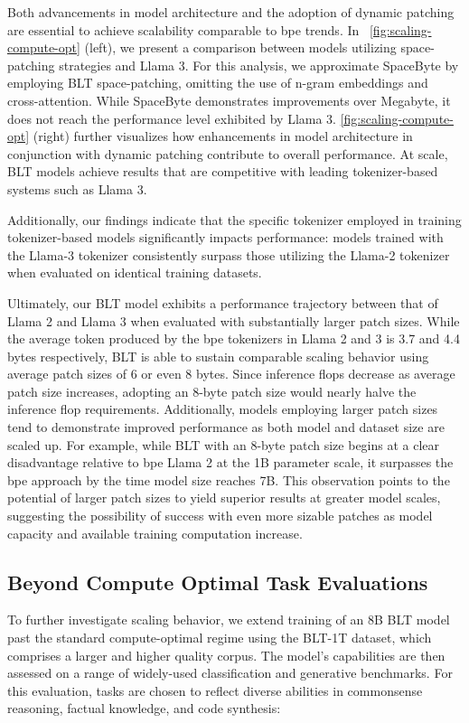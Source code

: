 Both advancements in model architecture and the adoption of dynamic patching are essential to achieve scalability comparable to bpe trends. In ~\autoref{fig:scaling-compute-opt} (left), we present a comparison between models utilizing space-patching strategies and Llama 3. For this analysis, we approximate SpaceByte \citep{slagle2024spacebyte} by employing {\textsc BLT} space-patching, omitting the use of n-gram embeddings and cross-attention. While SpaceByte demonstrates improvements over Megabyte, it does not reach the performance level exhibited by Llama 3. \autoref{fig:scaling-compute-opt} (right) further visualizes how enhancements in model architecture in conjunction with dynamic patching contribute to overall performance. At scale, {\textsc BLT} models achieve results that are competitive with leading tokenizer-based systems such as Llama 3.

Additionally, our findings indicate that the specific tokenizer employed in training tokenizer-based models significantly impacts performance: models trained with the Llama-3 tokenizer consistently surpass those utilizing the Llama-2 tokenizer when evaluated on identical training datasets.

Ultimately, our {\textsc BLT} model exhibits a performance trajectory between that of Llama 2 and Llama 3 when evaluated with substantially larger patch sizes. While the average token produced by the bpe tokenizers in Llama 2 and 3 is 3.7 and 4.4 bytes respectively, {\textsc BLT} is able to sustain comparable scaling behavior using average patch sizes of 6 or even 8 bytes. Since inference flops decrease as average patch size increases, adopting an 8-byte patch size would nearly halve the inference flop requirements. Additionally, models employing larger patch sizes tend to demonstrate improved performance as both model and dataset size are scaled up. For example, while {\textsc BLT} with an 8-byte patch size begins at a clear disadvantage relative to bpe Llama 2 at the 1B parameter scale, it surpasses the bpe approach by the time model size reaches 7B. This observation points to the potential of larger patch sizes to yield superior results at greater model scales, suggesting the possibility of success with even more sizable patches as model capacity and available training computation increase.

\subsection{Beyond Compute Optimal Task Evaluations}
\label{section:evals}
To further investigate scaling behavior, we extend training of an 8B {\textsc BLT} model past the standard compute-optimal regime using the {\textsc BLT}-1T dataset, which comprises a larger and higher quality corpus. The model’s capabilities are then assessed on a range of widely-used classification and generative benchmarks. For this evaluation, tasks are chosen to reflect diverse abilities in commonsense reasoning, factual knowledge, and code synthesis:
